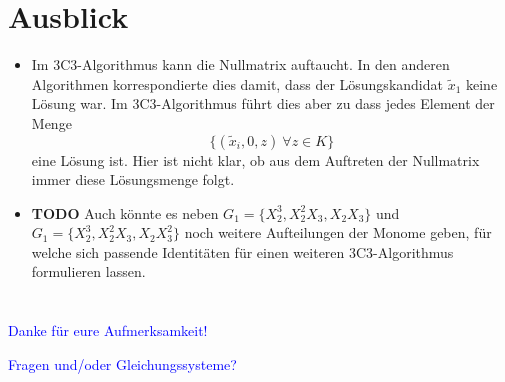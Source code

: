 \documentclass[11pt]{beamer}
\theoremstyle{custom}
\theoremstyle{custom}
\begin{document}
	\section{Ausblick}
	\begin{frame}
		\begin{itemize}
			\frametitle{Ausblick}
			\pause
			\item Im 3C3-Algorithmus kann die Nullmatrix auftaucht. In den anderen Algorithmen korrespondierte dies damit, dass der Lösungskandidat $\tilde{x}_1$ keine Lösung war. Im 3C3-Algorithmus führt dies aber zu dass jedes Element der Menge \begin{equation*}
				\{(\tilde{x}_i,0,z) \ \forall z \in K\}
			\end{equation*}
			eine Lösung ist. Hier ist nicht klar, ob aus dem Auftreten der Nullmatrix immer diese Lösungsmenge folgt.
			\pause
			\item \textbf{TODO} Auch könnte es neben $G_1=\{X_2^3,X_2^2X_3,X_2X_3\}$ und $G_1=\{X_2^3,X_2^2X_3,X_2X_3^2\}$ noch weitere Aufteilungen der Monome geben, für welche sich passende Identitäten für einen weiteren 3C3-Algorithmus formulieren lassen.
		\end{itemize}
	\end{frame}
	\section*{}
	\begin{frame}
		\begin{center}
			\huge \textcolor{blue}{Danke für eure Aufmerksamkeit!}
		\end{center}
	\end{frame}
		\begin{frame}
		\begin{center}
			\huge \textcolor{blue}{Fragen und/oder Gleichungssysteme?}
		\end{center}
	\end{frame}
		\begin{frame}
				
			\nocite{*}
			
	\end{frame}
\end{document}

